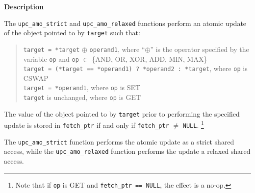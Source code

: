 {\bf Description}

\np The {\tt upc\_amo\_strict} and {\tt upc\_amo\_relaxed} functions perform
    an atomic update of the object pointed to by {\tt target} such that:

    \begin{verse}
      {\tt *target = *target} $\oplus$ {\tt *operand1},
        where ``$\oplus$'' is the operator specified by the variable {\tt op}
        and {\tt op} $\in$ \{AND, OR, XOR, ADD, MIN, MAX\} \\
      {\tt *target = (*target == *operand1) ? *operand2 : *target},
        where {\tt op} is CSWAP \\
      {\tt *target = *operand1},
        where {\tt op} is SET \\
      {\tt *target} is unchanged,
        where {\tt op} is GET \\
    \end{verse}

\np The value of the object pointed to by {\tt target} prior to performing
    the specified update is stored in {\tt fetch\_ptr} if and only if
    {\tt fetch\_ptr} $\neq$ {\tt NULL}.%
    \footnote{Note that if {\tt op} is GET and {\tt fetch\_ptr == NULL}, the
              effect is a no-op.}

\np The {\tt upc\_amo\_strict} function performs the atomic update as a strict
    shared access, while the {\tt upc\_amo\_relaxed} function performs the
    update a relaxed shared access.
